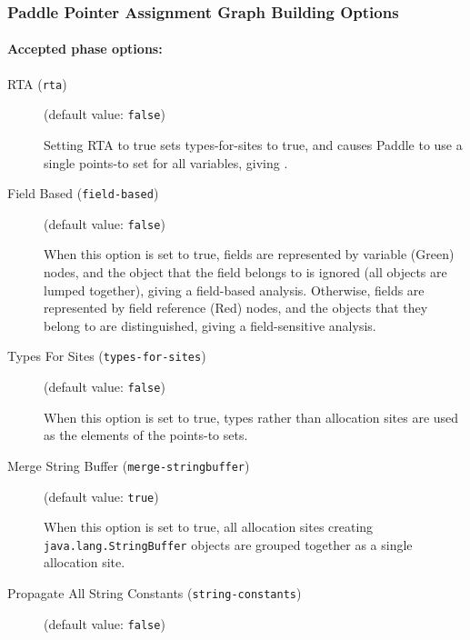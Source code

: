 \documentclass{article}
\begin{document}
\subsubsection{Paddle Pointer Assignment Graph Building Options}


\paragraph{Accepted phase options:} 

\begin{description}

\item[RTA ({\tt rta})]
(default value: {\tt false})




Setting RTA to true sets types-for-sites to true, and causes Paddle to use
a single points-to set for all variables, giving .
        


\item[Field Based ({\tt field-based})]
(default value: {\tt false})




When this option is set to true, fields are represented by variable
(Green) nodes, and the object that the field belongs to is ignored
(all objects are lumped together), giving a field-based analysis. Otherwise, fields are represented by
field reference (Red) nodes, and the objects that they belong to are
distinguished, giving a field-sensitive analysis.
        


\item[Types For Sites ({\tt types-for-sites})]
(default value: {\tt false})




When this option is set to true, types rather than allocation sites are
used as the elements of the points-to sets.
        


\item[Merge String Buffer ({\tt merge-stringbuffer})]
(default value: {\tt true})




When this option is set to true, all allocation sites creating
{\tt java.lang.StringBuffer} objects are grouped together as a single
allocation site.
        


\item[Propagate All String Constants ({\tt string-constants})]
(default value: {\tt false})





\end{description}
\end{document}
